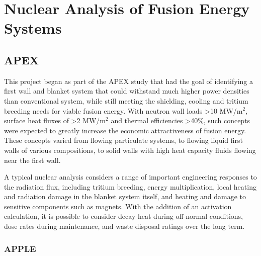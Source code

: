\chapter{Nuclear Analysis of Fusion Energy Systems}

\section{\acrfull{APEX}}

This project began as part of the APEX study that had the goal of identifying
a first wall and blanket system that could withstand much higher power
densities than conventional system, while still meeting the shielding, cooling
and tritium breeding needs for viable fusion energy.  With neutron wall loads
>10 MW/m$^2$, surface heat fluxes of >2 MW/m$^2$ and thermal efficiencies
>40\%, such concepts were expected to greatly increase the economic
attractiveness of fusion energy.  These concepts varied from flowing
particulate systems, to flowing liquid first walls of various compositions, to
solid walls with high heat capacity fluids flowing near the first wall.

A typical nuclear analysis considers a range of important engineering
responses to the radiation flux, including tritium breeding, energy
multiplication, local heating and radiation damage in the blanket system
itself, and heating and damage to sensitive components such as magnets.  With
the addition of an activation calculation, it is possible to consider decay
heat during off-normal conditions, dose rates during maintenance, and waste
disposal ratings over the long term.

\subsection{\acrfull{APPLE}}

